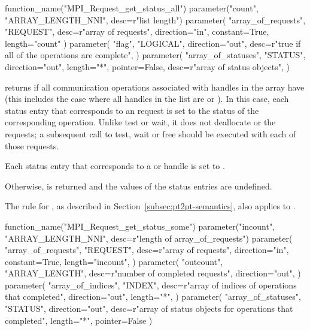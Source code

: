 \begin{mpi-binding}
    function_name("MPI_Request_get_status_all")
    parameter("count", "ARRAY_LENGTH_NNI", desc=r"list length")
    parameter(
        "array_of_requests",
        "REQUEST",
        desc=r"array of requests",
        direction="in", constant=True,
        length="count"
    )
    parameter(
        "flag",
        "LOGICAL",
        direction="out",
        desc=r"true if all of the operations are complete",
    )
    parameter(
        "array_of_statuses",
        "STATUS",
        direction="out",
        length="*",
        pointer=False,
        desc=r"array of status objects",
    )
\end{mpi-binding}

 returns 
if all communication operations associated
with  handles in the array have  (this includes the
case where all handles in the list are  or ).
In this case, each status entry that corresponds to an
 request
is set to the status of the corresponding
operation. Unlike test or wait, it does not
deallocate or  the requests; a subsequent call to test, wait or free
should be executed with each of those requests.

Each status entry that corresponds to a  or 
handle is set to .

Otherwise,
 is returned and the values of the status entries are undefined.

The 
rule for , as described in Section~\ref{subsec:pt2pt-semantics}, also applies to .


\begin{mpi-binding}
    function_name("MPI_Request_get_status_some")
    parameter("incount", "ARRAY_LENGTH_NNI", desc=r"length of array_of_requests")
    parameter(
        "array_of_requests",
        "REQUEST",
        desc=r"array of requests",
        direction="in", constant=True,
        length="incount",
    )
    parameter(
        "outcount",
        "ARRAY_LENGTH",
        desc=r"number of completed requests",
        direction="out",
    )
    parameter(
        "array_of_indices",
        "INDEX",
        desc=r"array of indices of operations that completed",
        direction="out",
        length="*",
    )
    parameter(
        "array_of_statuses",
        "STATUS",
        direction="out",
        desc=r"array of status objects for operations that completed",
        length="*",
        pointer=False
    )
\end{mpi-binding}

